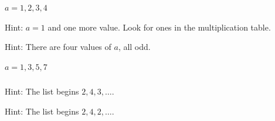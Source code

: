 \subsubsection*{ \answers}
\begin{apart}
    \item $a=1,2,3,4$
    \item Hint: $a=1$ and one more value.  Look for ones in the multiplication table.
    \item Hint: There are four values of $a$, all odd.
    \item $a=1,3,5,7$
\end{apart}

\subsubsection*{ \answers}
\begin{apart}
    \item Hint: The list begins $2, 4, 3, \ldots$.
    \item Hint: The list begins $2,4,2,\ldots$.
\end{apart}


